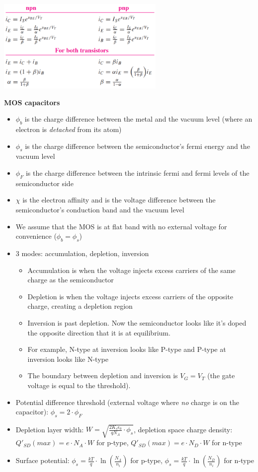 \documentclass{article}
\begin{document}
\begin{center}
    \includegraphics[align=c, height=4.5cm]{bjtcurrents.png}
\end{center}
\textbf{MOS capacitors}
\begin{itemize}
    \item $\phi_b$ is the charge difference between the metal and the vacuum level (where an electron is \textit{detached} from its atom)
    \item $\phi_s$ is the charge difference between the semiconductor's fermi energy and the vacuum level
    \item $\phi_F$ is the charge difference between the intrinsic fermi and fermi levels of the semiconductor side
    \item $\chi$ is the electron affinity and is the voltage difference between the semiconductor's conduction band and the vacuum level
    \item We assume that the MOS is at flat band with no external voltage for convenience ($\phi_b = \phi_s$)
    \item 3 modes: accumulation, depletion, inversion
    \begin{itemize}
        \item Accumulation is when the voltage injects excess carriers of the same charge as the semiconductor
        \item Depletion is when the voltage injects excess carriers of the opposite charge, creating a depletion region
        \item Inversion is past depletion. Now the semiconductor looks like it's doped the opposite direction that it is at equilibrium.
        \item For example, N-type at inversion looks like P-type and P-type at inversion looks like N-type
        \item The boundary between depletion and inversion is $V_G = V_T$ (the gate voltage is equal to the threshold).
    \end{itemize}
    \item Potential difference threshold (external voltage where \textit{no} charge is on the capacitor): $\phi_s = 2 \cdot \phi_F$
    \item Depletion layer width: $W = \sqrt{\frac{2 K_s \epsilon_0}{q N_A} \cdot \phi_s}$, depletion space charge density: $Q'_{SD}(max) = e \cdot N_A \cdot W$ for p-type, $Q'_{SD}(max) = e \cdot N_D \cdot W$ for n-type
    \item Surface potential: $\phi_s = \frac{kT}{q} \cdot \ln\left(\frac{N_A}{n_i}\right)$ for p-type, $\phi_s = \frac{kT}{q} \cdot \ln\left(\frac{N_D}{n_i}\right)$ for n-type
\end{itemize}
\end{document}
